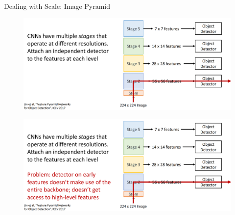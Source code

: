 \documentclass[10pt]{beamer}
\theoremstyle{remark}
\theoremstyle{definition}
\begin{document}
\begin{frame}[allowframebreaks]{Dealing with Scale: Image Pyramid}
\begin{figure}
\centering
\includegraphics[width=1.0\textwidth,height=1.0\textheight,keepaspectratio]{./images/scale_4.png}
\end{figure}

\framebreak

\begin{figure}
\centering
\includegraphics[width=1.0\textwidth,height=1.0\textheight,keepaspectratio]{./images/scale_5.png}
\end{figure}
    
\end{frame}
\end{document}
